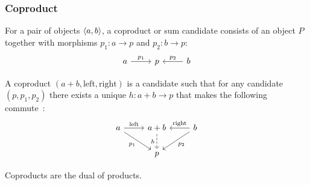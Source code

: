 \subsubsection*{Coproduct}

\begin{definition}

	For a pair of objects $\langle a, b\rangle$, a coproduct or sum candidate consists of an
	object $P$ together with morphisms $p_1: a\to p$ and
	$p_2:b\to p$:
	\[\begin{tikzcd}[ampersand replacement=\&]
		a \& p \& b
		\arrow["{p_1}", from=1-1, to=1-2]
		\arrow["{p_2}"', from=1-3, to=1-2]
	\end{tikzcd}\]

	A coproduct $(a + b, \mathrm{left}, \mathrm{right})$ is a candidate such that
	for any candidate $(p, p_1, p_2)$ there exists a unique $h: a+b\to p$ that
	makes the following
	commute~\parencite[p.~127]{leinster:basic_category_theory}:
	\[\begin{tikzcd}[ampersand replacement=\&]
		a \& {a+b} \& b \\
		\& p
		\arrow["{\mathrm{left}}", from=1-1, to=1-2]
		\arrow["{\mathrm{right}}"', from=1-3, to=1-2]
		\arrow["{p_1}"', from=1-1, to=2-2]
		\arrow["{p_2}", from=1-3, to=2-2]
		\arrow["h"', dashed, from=1-2, to=2-2]
	\end{tikzcd}\]
\end{definition}

\begin{remark}
	Coproducts are the dual of products.
\end{remark}

